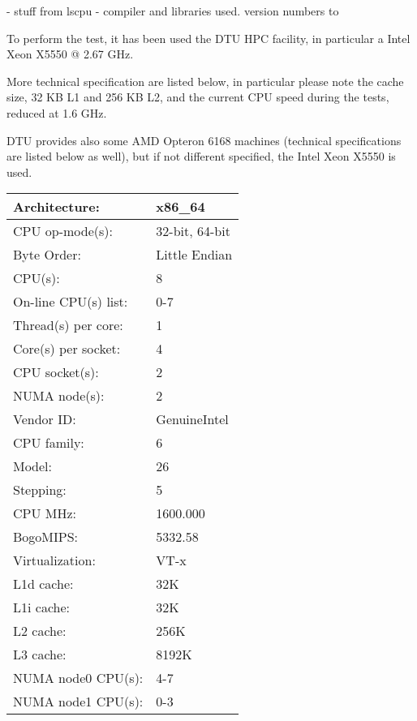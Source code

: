  - stuff from lscpu
 - compiler and libraries used. version numbers to

 
To perform the test, it has been used the DTU HPC facility, in particular a Intel Xeon X5550 @ 2.67 GHz.

More technical specification are listed below, in particular please note the cache size, 32 KB L1 and 256 KB L2, and the current CPU speed during the tests, reduced at 1.6 GHz.

DTU provides also some AMD Opteron 6168 machines (technical specifications are listed below as well), but if not different specified, the Intel Xeon X5550 is used.
 
\begin{tabular}{ l l }
\hline
Architecture:          & x86_64\\ \hline
CPU op-mode(s):        & 32-bit, 64-bit\\ \hline
Byte Order:            & Little Endian\\ \hline
CPU(s):                & 8\\ \hline
On-line CPU(s) list:   & 0-7\\ \hline
Thread(s) per core:    & 1\\ \hline
Core(s) per socket:    & 4\\ \hline
CPU socket(s):         & 2\\ \hline
NUMA node(s):          & 2\\ \hline
Vendor ID:             & GenuineIntel\\ \hline
CPU family:            & 6\\ \hline
Model:                 & 26\\ \hline
Stepping:              & 5\\ \hline
CPU MHz:               & 1600.000\\ \hline
BogoMIPS:              & 5332.58\\ \hline
Virtualization:        & VT-x\\ \hline
L1d cache:             & 32K\\ \hline
L1i cache:             & 32K\\ \hline
L2 cache:              & 256K\\ \hline
L3 cache:              & 8192K\\ \hline
NUMA node0 CPU(s):     & 4-7\\ \hline
NUMA node1 CPU(s):     & 0-3\\ \hline
\end{tabular}

